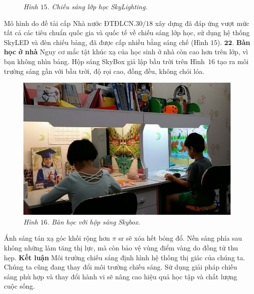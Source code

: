 \begin{multicols}{2}
\begin{figure}[H]
		\caption{\small\textit{\color{timhieukhoahoc}Hình $15$. Chiếu sáng lớp học SkyLighting.}}
		\vspace*{-10pt}
	\end{figure}
	Mô hình do đề tài cấp Nhà nước ĐTĐLCN.$30/18$ xây dựng đã đáp ứng vượt mức tất cả các tiêu chuẩn quốc gia và quốc tế về chiếu sáng lớp học, sử dụng hệ thống SkyLED và đèn chiếu bảng, đã được cấp nhiều bằng sáng chế (Hình $15$).
	\vskip 0.1cm
	$\pmb{22.}$ \textbf{\color{timhieukhoahoc}Bàn học ở nhà}
	\vskip 0.1cm
	Nguy cơ mắc tật khúc xạ của học sinh ở nhà còn cao hơn trên lớp, vì bạn không nhìn bảng. Hộp sáng SkyBox giả lập bầu trời trên Hình~$16$ tạo ra môi trường sáng gần với bầu trời, độ rọi cao, đồng đều, không chói lóa. 
	\begin{figure}[H]
		\vspace*{-5pt}
		\centering
		\captionsetup{labelformat= empty, justification=centering}
		\includegraphics[width= 1\linewidth]{16}
		\caption{\small\textit{\color{timhieukhoahoc}Hình $16.$ Bàn học với hộp sáng Skybox.}}
		\vspace*{-5pt}
	\end{figure}
	Ánh sáng tán xạ góc khối rộng hơn $\pi$ sr sẽ xóa hết bóng đổ. Nền sáng phía sau không những làm tăng thị lực, mà còn bảo vệ vùng điểm vàng do đồng tử thu hẹp. 
	\vskip 0.1cm
	\textbf{\color{timhieukhoahoc}Kết luận}
	\vskip 0.1cm
	Môi trường chiếu sáng định hình hệ thống thị giác của chúng ta. Chúng ta cũng đang thay đổi môi trường chiếu sáng. Sử dụng giải pháp chiếu sáng phù hợp và thay đổi hành vi sẽ nâng cao hiệu quả học tập và chất lượng cuộc sống. 
\end{multicols}